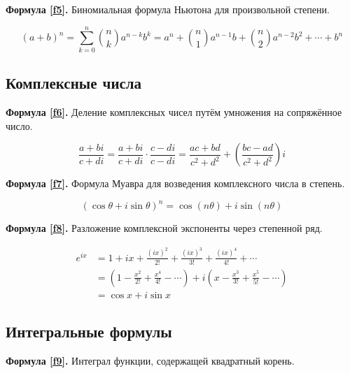 \documentclass[a4paper,12pt]{article}
\begin{document}
\vspace{15pt}
\textbf{Формула \ref{f5}.}
Биномиальная формула Ньютона для произвольной степени. \cite{art1,art2,art3}

\begin{equation}
(a+b)^n=\sum_{k=0}^{n}\binom{n}{k}a^{n-k}b^k=a^n+\binom{n}{1}a^{n-1}b+\binom{n}{2}a^{n-2}b^2+\cdots+b^n
\label{f5}
\end{equation}


\subsection{Комплексные числа}
\vspace{15pt}
\textbf{Формула \ref{f6}.}
Деление комплексных чисел путём умножения на сопряжённое число.

\begin{equation}
\frac{a+bi}{c+di}=\frac{a+bi}{c+di}\cdot\frac{c-di}{c-di}=\frac{ac+bd}{c^2+d^2}+\left(\frac{bc-ad}{c^2+d^2}\right)i
\label{f6}
\end{equation}


\vspace{15pt}
\textbf{Формула \ref{f7}.}
Формула Муавра для возведения комплексного числа в степень.

\begin{equation}
(\cos\theta+i\sin\theta)^n=\cos(n\theta)+i\sin(n\theta)
\label{f7}
\end{equation}


\vspace{15pt}
\textbf{Формула \ref{f8}.}
Разложение комплексной экспоненты через степенной ряд.

\begin{equation}
\begin{split}
e^{ix}&=1+ix+\frac{(ix)^2}{2!}+\frac{(ix)^3}{3!}+\frac{(ix)^4}{4!}+\cdots\\
&=\left(1-\frac{x^2}{2!}+\frac{x^4}{4!}-\cdots\right)+i\left(x-\frac{x^3}{3!}+\frac{x^5}{5!}-\cdots\right)\\
&=\cos x+i\sin x
\end{split}
\label{f8}
\end{equation}


\subsection{Интегральные формулы}
\vspace{15pt}
\textbf{Формула \ref{f9}.}
Интеграл функции, содержащей квадратный корень.
\end{document}
